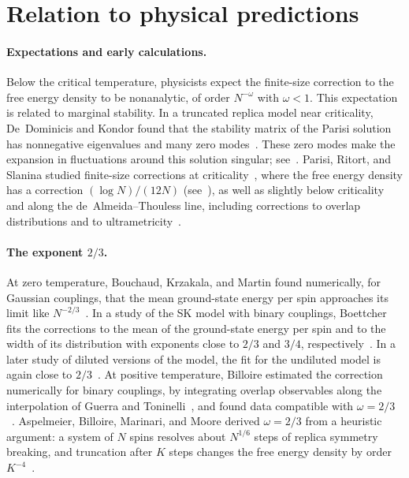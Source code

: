 \section{Relation to physical predictions}\label{subsec:intro-physics}

\paragraph{Expectations and early calculations.}
Below the critical temperature, physicists expect the finite-size
correction to the free energy density to be nonanalytic, of order
$N^{-\omega}$ with $\omega<1$. This expectation is related to marginal
stability. In a truncated replica model near criticality,
De~Dominicis and Kondor found that the stability matrix of the Parisi
solution has nonnegative eigenvalues and many zero
modes~\cite[pp.~606--608]{DeDominicisKondor1983}. These zero modes make the
expansion in fluctuations around this solution singular;
see~\cite[Section~2]{FranzParisiRicciTersenghi2026}. Parisi, Ritort,
and Slanina studied finite-size corrections at
criticality~\cite{ParisiRitortSlanina1993Critical},
where the free energy density has a correction $(\log N)/(12N)$
(see~\cite{Billoire2006FiniteSize}), as well as slightly below
criticality and along the de~Almeida--Thouless line, including
corrections to overlap distributions and to
ultrametricity~\cite{ParisiRitortSlanina1993Corrections}.

\paragraph{The exponent $2/3$.}
At zero temperature, Bouchaud, Krzakala, and Martin found numerically,
for Gaussian couplings, that the mean ground-state energy per spin
approaches its limit like
$N^{-2/3}$~\cite[Section~VI\,B]{BouchaudKrzakalaMartin2003}. In a
study of the SK model with binary couplings, Boettcher fits the corrections to the
mean of the ground-state energy per spin and to the width of its
distribution with exponents close to $2/3$ and $3/4$,
respectively~\cite[Section~3]{Boettcher2005}. In a later study of
diluted versions of the model, the fit for the undiluted model is
again close to $2/3$~\cite[Table~I]{Boettcher2020Diluted}. At positive
temperature, Billoire estimated the correction numerically for binary
couplings, by integrating overlap observables along the interpolation of
Guerra and Toninelli~\cite{GuerraToninelli2002}, and found data
compatible with $\omega=2/3$~\cite{Billoire2006FiniteSize}. Aspelmeier,
Billoire, Marinari, and Moore derived $\omega=2/3$ from a heuristic
argument: a system of $N$ spins resolves about $N^{1/6}$ steps of
replica symmetry breaking, and truncation after $K$ steps changes the
free energy density by order
$K^{-4}$~\cite[Section~2]{AspelmeierEtAl2008FiniteSize}.

